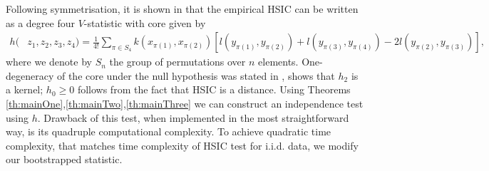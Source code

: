 Following symmetrisation, it is shown in \cite{gretton_kernel_2008,chwialkowski2014kernel} that the empirical HSIC can be written as a degree four $V$-statistic with core given by
\begin{align*}
h(&z_1,z_2,z_3,z_4) = \frac{1}{4!} \sum_{\pi \in S_4}  k(x_{\pi(1)},x_{\pi(2)}) [  l(y_{\pi(1)},y_{\pi(2)}) +  l(y_{\pi(3)},y_{\pi(4)}) - 2  l(y_{\pi(2)},y_{\pi(3)})],  
\end{align*}
where we denote by $S_n$ the group of permutations over $n$ elements. 
One-degeneracy of the core under the null hypothesis was stated in \cite[Theorem 2]{gretton_kernel_2008}, \cite[Section A.2, following eq. (11)]{gretton_kernel_2008} shows that $h_2$ is a kernel; $h_0\geq 0$ follows from the fact that HSIC is a distance. Using Theorems \ref{th:mainOne},\ref{th:mainTwo},\ref{th:mainThree} we can construct an independence test using $h$. Drawback of this test, when implemented in the most straightforward way,  is its quadruple computational complexity. To achieve quadratic time complexity, that matches time complexity of HSIC test for i.i.d. data, we modify our bootstrapped statistic.

